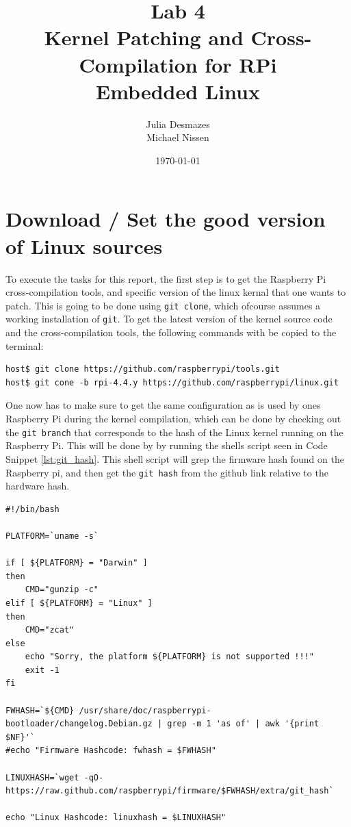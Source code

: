 \documentclass[a4paper,oneside,onecolumn]{article}
\newcommand{\code}[1]{\colorbox{codegray}{\texttt{#1}}}
\begin{document}
\title{Lab 4 \\ Kernel Patching and Cross-Compilation for RPi \\ Embedded Linux}
\author{Julia Desmazes \\ Michael Nissen}
\date{\today}
\maketitle
\bigskip

\section{Download / Set the good version of Linux sources}

\noindent
To execute the tasks for this report, the first step is to get the Raspberry Pi cross-compilation tools, and specific version of the linux kernal that one wants to patch. This is going to be done using \code{git clone}, which ofcourse assumes a working installation of \texttt{git}.
\newline
To get the latest version of the kernel source code and the cross-compilation tools, the following commands with be copied to the terminal:
\begin{lstlisting}
host$ git clone https://github.com/raspberrypi/tools.git
host$ git cone -b rpi-4.4.y https://github.com/raspberrypi/linux.git
\end{lstlisting}
One now has to make sure to get the same configuration as is used by ones Raspberry Pi during the kernel compilation, which can be done by checking out the \texttt{git branch} that corresponds to the hash of the Linux kernel running on the Raspberry Pi.
\newline
This will be done by by running the shells script seen in Code Snippet \ref{lst:git_hash}. This shell script will grep the firmware hash found on the Raspberry pi, and then get the \texttt{git hash} from the github link relative to the hardware hash.
\begin{lstlisting}[caption={Shell script to get Linux kernel git hash}, label={lst:git_hash}]
#!/bin/bash

PLATFORM=`uname -s` 

if [ ${PLATFORM} = "Darwin" ]
then
    CMD="gunzip -c"
elif [ ${PLATFORM} = "Linux" ]
then
    CMD="zcat"
else
    echo "Sorry, the platform ${PLATFORM} is not supported !!!"    
    exit -1
fi

FWHASH=`${CMD} /usr/share/doc/raspberrypi-bootloader/changelog.Debian.gz | grep -m 1 'as of' | awk '{print $NF}'`
#echo "Firmware Hashcode: fwhash = $FWHASH"

LINUXHASH=`wget -qO- https://raw.github.com/raspberrypi/firmware/$FWHASH/extra/git_hash`

echo "Linux Hashcode: linuxhash = $LINUXHASH"
\end{lstlisting}
\end{document}
